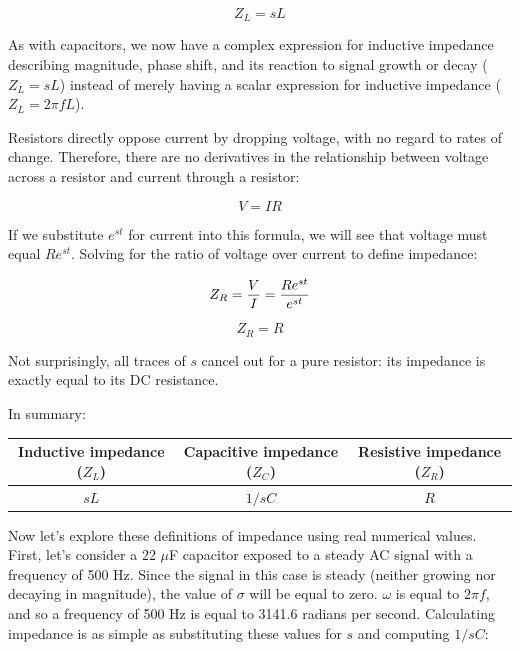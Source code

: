 $$Z_L = sL$$

As with capacitors, we now have a complex expression for inductive impedance describing magnitude, phase shift, and its reaction to signal growth or decay ($Z_L = sL$) instead of merely having a scalar expression for inductive impedance ($Z_L = 2 \pi f L$).

\vskip 10pt

\filbreak

Resistors directly oppose current by dropping voltage, with no regard to rates of change.  Therefore, there are no derivatives in the relationship between voltage across a resistor and current through a resistor:

$$V = IR$$

If we substitute $e^{st}$ for current into this formula, we will see that voltage must equal $Re^{st}$.  Solving for the ratio of voltage over current to define impedance:

$$Z_R = {V \over I} = {Re^{st} \over e^{st}}$$

$$Z_R = R$$

Not surprisingly, all traces of $s$ cancel out for a pure resistor: its impedance is exactly equal to its DC resistance.

\vskip 20pt

\filbreak

In summary:

\begin{center}
\begin{tabular}{| c | c | c |}
\hline 
\textbf{Inductive impedance} ($Z_L$) & \textbf{Capacitive impedance} ($Z_C$) & \textbf{Resistive impedance} ($Z_R$) \\[3pt] \hline
$sL$ & $1 / sC$ & $R$ \\[3pt] \hline 
\end{tabular}
\end{center}

\vskip 10pt

\filbreak

Now let's explore these definitions of impedance using real numerical values.  First, let's consider a 22 $\mu$F capacitor exposed to a steady AC signal with a frequency of 500 Hz.  Since the signal in this case is steady (neither growing nor decaying in magnitude), the value of $\sigma$ will be equal to zero.  $\omega$ is equal to $2 \pi f$, and so a frequency of 500 Hz is equal to 3141.6 radians per second.  Calculating impedance is as simple as substituting these values for $s$ and computing $1 / sC$:

